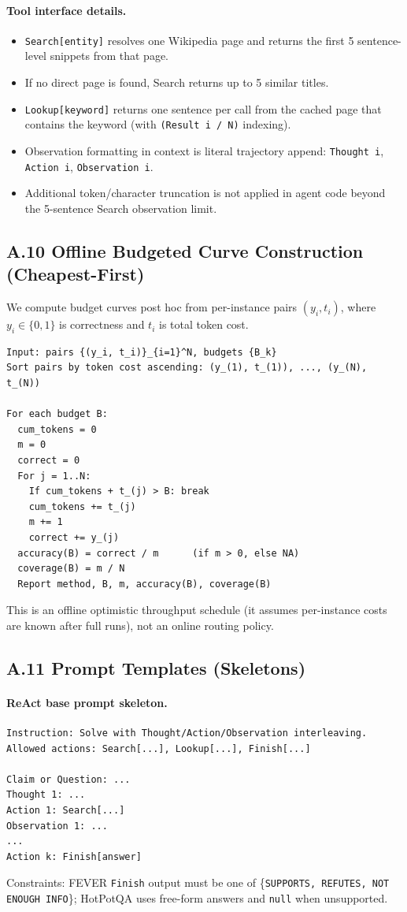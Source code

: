 \paragraph{Tool interface details.}
\begin{itemize}
\item \texttt{Search[entity]} resolves one Wikipedia page and returns the first 5 sentence-level snippets from that page.
\item If no direct page is found, Search returns up to 5 similar titles.
\item \texttt{Lookup[keyword]} returns one sentence per call from the cached page that contains the keyword (with \texttt{(Result i / N)} indexing).
\item Observation formatting in context is literal trajectory append:
  \texttt{Thought i}, \texttt{Action i}, \texttt{Observation i}.
\item Additional token/character truncation is not applied in agent code beyond the 5-sentence Search observation limit.
\end{itemize}

\subsection{A.10 Offline Budgeted Curve Construction (Cheapest-First)}
We compute budget curves post hoc from per-instance pairs $(y_i, t_i)$, where $y_i \in \{0,1\}$ is correctness and $t_i$ is total token cost.
\begin{verbatim}
Input: pairs {(y_i, t_i)}_{i=1}^N, budgets {B_k}
Sort pairs by token cost ascending: (y_(1), t_(1)), ..., (y_(N), t_(N))

For each budget B:
  cum_tokens = 0
  m = 0
  correct = 0
  For j = 1..N:
    If cum_tokens + t_(j) > B: break
    cum_tokens += t_(j)
    m += 1
    correct += y_(j)
  accuracy(B) = correct / m      (if m > 0, else NA)
  coverage(B) = m / N
  Report method, B, m, accuracy(B), coverage(B)
\end{verbatim}
This is an offline optimistic throughput schedule (it assumes per-instance costs are known after full runs), not an online routing policy.

\subsection{A.11 Prompt Templates (Skeletons)}
\paragraph{ReAct base prompt skeleton.}
\begin{verbatim}
Instruction: Solve with Thought/Action/Observation interleaving.
Allowed actions: Search[...], Lookup[...], Finish[...]

Claim or Question: ...
Thought 1: ...
Action 1: Search[...]
Observation 1: ...
...
Action k: Finish[answer]
\end{verbatim}
Constraints: FEVER \texttt{Finish} output must be one of \{\texttt{SUPPORTS, REFUTES, NOT ENOUGH INFO}\}; HotPotQA uses free-form answers and \texttt{null} when unsupported.

